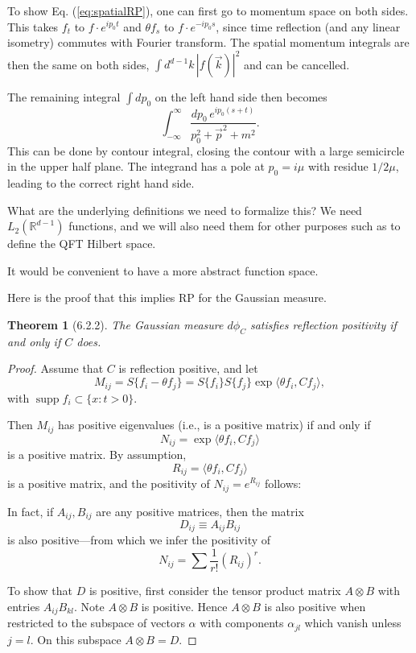 \documentclass{article}
\newcommand{\1}{\mathbbm{1}}
\theoremstyle{plain}
\newtheorem{theorem}{Theorem}[section]
\theoremstyle{definition}
\numberwithin{equation}{section}
\def\IR{\mathbb{R}}
\newcommand{\be}{\begin{equation}}
\newcommand{\ee}{\end{equation}}
\begin{document}
To show Eq. (\ref{eq:spatialRP}), one can first go to momentum space on both sides.  This takes $f_t$ to $f \cdot e^{ip_0 t}$
and $\theta f_s$ to $f \cdot e^{-ip_0 s}$, since time reflection (and any linear isometry) commutes with Fourier transform.
The spatial momentum integrals are then the same on both sides, $\int d^{d-1} k \, |f(\vec k)|^2$ and can be cancelled.

The remaining integral $\int dp_0$ on the left hand side then becomes 
\be
\int_{-\infty}^\infty \frac{dp_0\, e^{ip_0(s+t)}}{p_0^2 + \vec p^2 + m^2} .
\ee
This can be done by contour integral, closing the contour with a large semicircle in the upper half plane.
The integrand has a pole at $p_0 = i\mu$ with residue $1/2\mu$, leading to the correct right hand side.

What are the underlying definitions we need to formalize this?  We need $L_2(\IR^{d-1})$ functions, and we will
also need them for other purposes such as to define the QFT Hilbert space.

It would be convenient to have a more abstract function space.

Here is the proof that this implies RP for the Gaussian measure.

\begin{theorem}[6.2.2]
The Gaussian measure $d\phi_C$ satisfies reflection positivity 
if and only if $C$ does.
\end{theorem}

\begin{proof}
Assume that $C$ is reflection positive, and let
\[
M_{ij} = S\{ f_i - \theta f_j \} 
       = S\{ f_i \} S\{ f_j \} \exp \langle \theta f_i, C f_j \rangle ,
\]
with $\operatorname{supp} f_i \subset \{ x : t > 0 \}$.

Then $M_{ij}$ has positive eigenvalues (i.e., is a positive matrix) 
if and only if 
\[
N_{ij} = \exp \langle \theta f_i, C f_j \rangle
\]
is a positive matrix. By assumption, 
\[
R_{ij} = \langle \theta f_i, C f_j \rangle
\]
is a positive matrix, and the positivity of $N_{ij} = e^{R_{ij}}$ follows: 

In fact, if $A_{ij}, B_{ij}$ are any positive matrices, then the matrix
\[
D_{ij} \equiv A_{ij} B_{ij}
\]
is also positive—from which we infer the positivity of
\[
N_{ij} = \sum \frac{1}{r!} (R_{ij})^r .
\]

To show that $D$ is positive, first consider the tensor product matrix 
$A \otimes B$ with entries $A_{ij} B_{kl}$. 
Note $A \otimes B$ is positive. Hence $A \otimes B$ is also positive 
when restricted to the subspace of vectors $\alpha$ with components 
$\alpha_{jl}$ which vanish unless $j = l$. 
On this subspace $A \otimes B = D$.
\end{proof}
\end{document}
